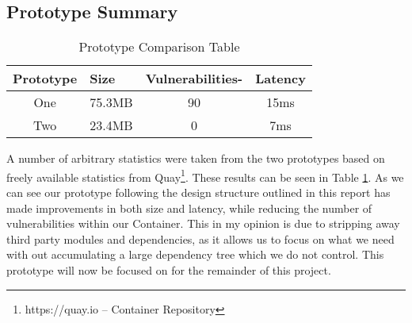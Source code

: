\subsection{Prototype Summary}
\label{sub:protosum}

\begin{table}[!ht]
\centering
\begin{tabular}{cccc}
\hline
\multicolumn{1}{l}{Prototype} & \multicolumn{1}{l}{Size} & \multicolumn{1}{l}{Vulnerabilities-} & \multicolumn{1}{l}{Latency} \\ \hline
One & 75.3MB & 90 & 15ms \\
Two & 23.4MB & 0 & 7ms \\ \hline
\end{tabular}
\caption{Prototype Comparison Table}
\label{table-comp}
\end{table}
A number of arbitrary statistics were taken from the two prototypes based on freely available statistics from \gls{Quay}\footnote{https://quay.io -- Container Repository}. These results can be seen in Table \ref{table-comp}. As we can see our prototype following the design structure outlined in this report has made improvements in both size and latency, while reducing the number of vulnerabilities within our \gls{Container}. This in my opinion is due to stripping away third party modules and dependencies, as it allows us to focus on what we need with out accumulating a large dependency tree which we do not control. This prototype will now be focused on for the remainder of this project.
